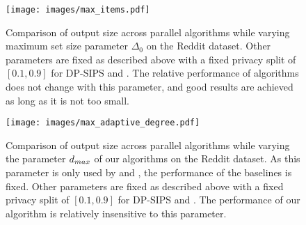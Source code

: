 \begin{figure}[t]
    \centering
    \texttt{[image: images/max\_items.pdf]}
    \caption{Comparison of output size across parallel algorithms while varying maximum set size parameter $\Delta_0$ on the Reddit dataset. Other parameters are fixed as described above with a fixed privacy split of $[0.1,0.9]$ for DP-SIPS and \ouralgotworounds{}. The relative performance of algorithms does not change with this parameter, and good results are achieved as long as it is not too small.}
    \label{fig:cap}
\end{figure}

\begin{figure}[!ht]
    \centering
    \texttt{[image: images/max\_adaptive\_degree.pdf]}
    \caption{Comparison of output size across parallel algorithms while varying the parameter $d_{max}$ of our algorithms on the Reddit dataset. As this parameter is only used by \ouralgo{} and \ouralgotworounds{}, the performance of the baselines is fixed. Other parameters are fixed as described above with a fixed privacy split of $[0.1,0.9]$ for DP-SIPS and \ouralgotworounds{}. The performance of our algorithm is relatively insensitive to this parameter.}
    \label{fig:dmax}
\end{figure}